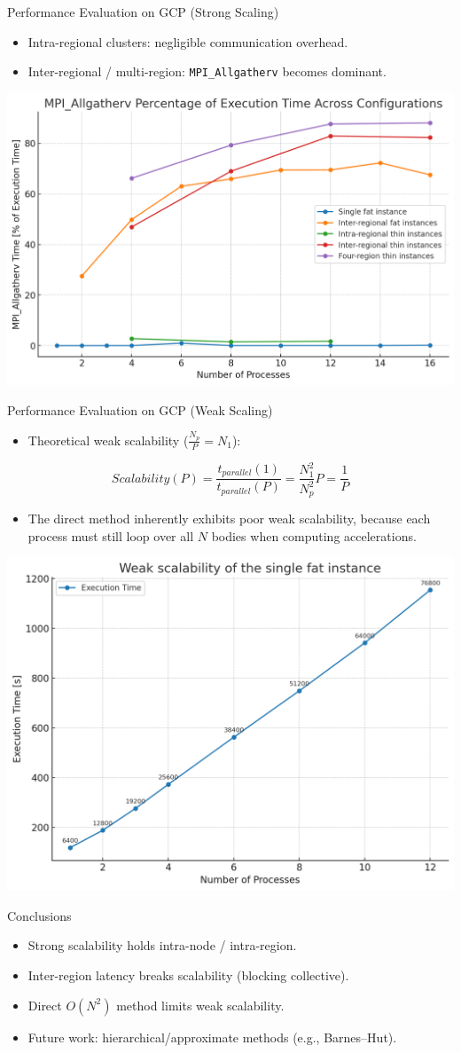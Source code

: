 \documentclass{beamer}
\begin{document}
\begin{frame}{Performance Evaluation on GCP (Strong Scaling)}
  \begin{itemize}
    \item Intra-regional clusters: negligible communication overhead.
    \item Inter-regional / multi-region: \texttt{MPI\_Allgatherv} becomes dominant.
  \end{itemize}
  \centering
  \includegraphics[width=0.85\linewidth]{communication_fraction_ex_time.png}
\end{frame}


\begin{frame}{Performance Evaluation on GCP (Weak Scaling)}
\begin{itemize}
	\item Theoretical weak scalability ($\tfrac{N_p}{P} = N_1$):
\end{itemize}
\[
Scalability(P) = \frac{t_{parallel}(1)}{t_{parallel}(P)} = \frac{N_1^2}{N_p^2}P = \frac{1}{P}
\]
\begin{itemize}
	\item The direct method inherently exhibits poor weak scalability, because each process must still loop over all $N$ bodies when computing accelerations.
\end{itemize}
  \centering
  \includegraphics[width=0.47\linewidth]{parallel_weak_scalability.png}
\end{frame}

\begin{frame}{Conclusions}
  \begin{itemize}
    \item Strong scalability holds intra-node / intra-region.
    \item Inter-region latency breaks scalability (blocking collective).
    \item Direct $O(N^2)$ method limits weak scalability.
    \item Future work: hierarchical/approximate methods (e.g., Barnes--Hut).
  \end{itemize}
\end{frame}
\end{document}
